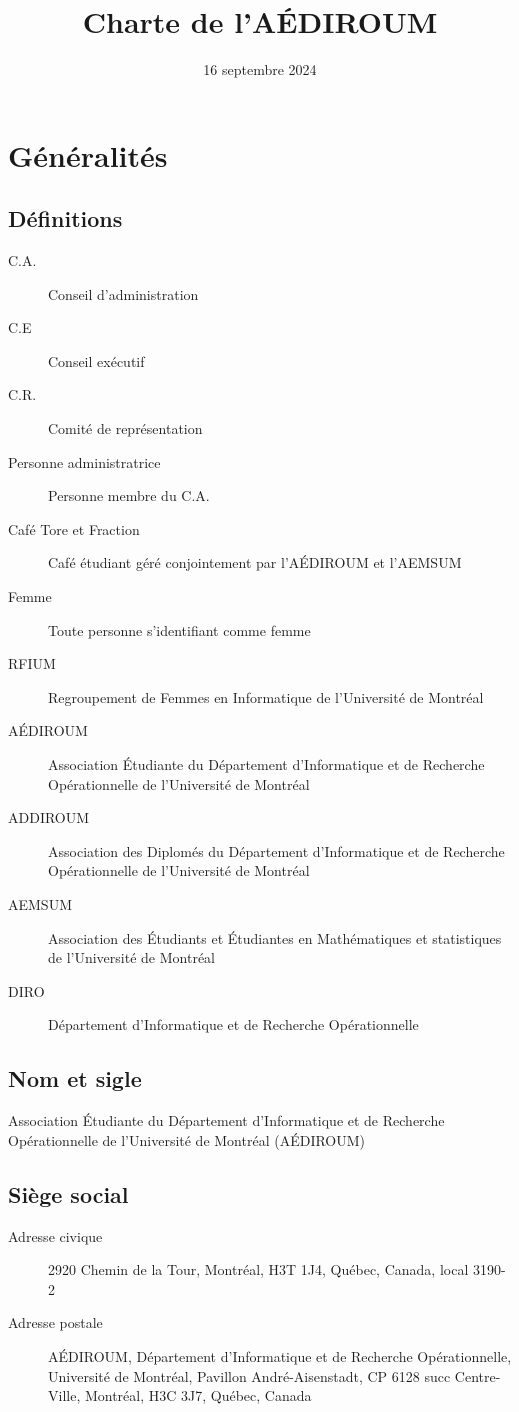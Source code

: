 \documentclass{aediroum}
\title{Charte de l'AÉDIROUM}
\date{16 septembre 2024}
\begin{document}
\maketitle

\section{Généralités}\label{sec:generalites}

\subsection{Définitions}\label{sec:definitions}
\begin{description}
    \item[C.A.] Conseil d’administration
    \item[C.E] Conseil exécutif
    \item[C.R.] Comité de représentation
    \item[Personne administratrice] Personne membre du C.A.
    \item[Café Tore et Fraction] Café étudiant géré conjointement par l’AÉDIROUM et l’AEMSUM
    \item[Femme] Toute personne s'identifiant comme femme
    \item[RFIUM] Regroupement de Femmes en Informatique de l'Université de Montréal
    \item[AÉDIROUM] Association Étudiante du Département d'Informatique et de Recherche Opérationnelle de l'Université de Montréal
    \item[ADDIROUM] Association des Diplomés du Département d'Informatique et de Recherche Opérationnelle de l'Université de Montréal
    \item[AEMSUM] Association des Étudiants et Étudiantes en Mathématiques et statistiques de l'Université de Montréal
    \item[DIRO] Département d'Informatique et de Recherche Opérationnelle
\end{description}


\subsection{Nom et sigle}\label{sec:nom-et-sigle}
Association Étudiante du Département d'Informatique et de Recherche Opérationnelle de l'Université de Montréal (AÉDIROUM)

\subsection{Siège social}\label{sec:siege-social}
  \begin{description}
  \item[Adresse civique] 2920 Chemin de la Tour, Montréal, H3T 1J4, Québec, Canada, local 3190-2
  \item[Adresse postale] AÉDIROUM, Département d'Informatique et de Recherche Opérationnelle, Université de Montréal, Pavillon André-Aisenstadt, CP 6128 succ Centre-Ville, Montréal, H3C 3J7, Québec, Canada
  \end{description}
\end{document}
